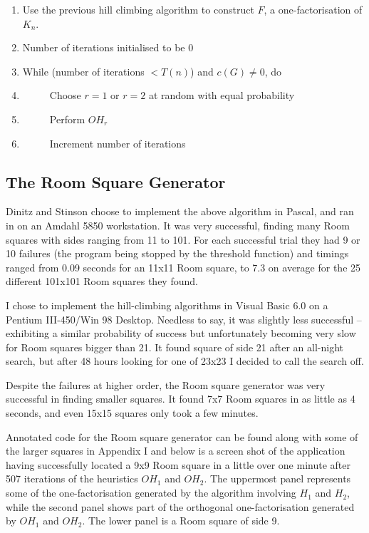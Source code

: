 \documentclass[
  12pt,
  a4paper]{book}
\begin{document}
\begin{enumerate}
\def\labelenumi{\arabic{enumi}.}
\item
  Use the previous hill climbing algorithm to construct \(F\), a
  one-factorisation of \(K_n\).
\item
  Number of iterations initialised to be \(0\)
\item
  While (number of iterations \(<T(n)\)) and \(c(G) \neq 0\), do
\item
  \(\hspace{1cm}\) Choose \(r=1\) or \(r=2\) at random with equal
  probability
\item
  \(\hspace{1cm}\) Perform \(OH_r\)
\item
  \(\hspace{1cm}\) Increment number of iterations
\end{enumerate}

\hypertarget{the-room-square-generator}{%
\subsection{The Room Square Generator}\label{the-room-square-generator}}

Dinitz and Stinson choose to implement the above algorithm in Pascal,
and ran in on an Amdahl 5850 workstation. It was very successful,
finding many Room squares with sides ranging from 11 to 101. For each
successful trial they had 9 or 10 failures (the program being stopped by
the threshold function) and timings ranged from 0.09 seconds for an
11x11 Room square, to 7.3 on average for the 25 different 101x101 Room
squares they found.

I chose to implement the hill-climbing algorithms in Visual Basic 6.0 on
a Pentium III-450/Win 98 Desktop. Needless to say, it was slightly less
successful -- exhibiting a similar probability of success but
unfortunately becoming very slow for Room squares bigger than 21. It
found square of side 21 after an all-night search, but after 48 hours
looking for one of 23x23 I decided to call the search off.

Despite the failures at higher order, the Room square generator was very
successful in finding smaller squares. It found 7x7 Room squares in as
little as 4 seconds, and even 15x15 squares only took a few minutes.

Annotated code for the Room square generator can be found along with
some of the larger squares in Appendix I and below is a screen shot of
the application having successfully located a 9x9 Room square in a
little over one minute after 507 iterations of the heuristics \(OH_1\)
and \(OH_2\). The uppermost panel represents some of the
one-factorisation generated by the algorithm involving \(H_1\) and
\(H_2\), while the second panel shows part of the orthogonal
one-factorisation generated by \(OH_1\) and \(OH_2\). The lower panel is
a Room square of side 9.
\end{document}
